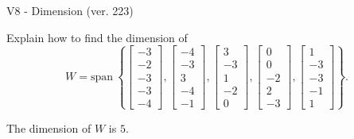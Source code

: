 \begin{exercise}
  \begin{exerciseTitle}V8 - Dimension (ver. 223)\end{exerciseTitle}
  \begin{exerciseStatement}
    Explain how to find the dimension of 
\[W=\mathrm{span}\ \left\{\left[\begin{array}{r}
-3 \\
-2 \\
-3 \\
-3 \\
-4
\end{array}\right] , \left[\begin{array}{r}
-4 \\
-3 \\
3 \\
-4 \\
-1
\end{array}\right] , \left[\begin{array}{r}
3 \\
-3 \\
1 \\
-2 \\
0
\end{array}\right] , \left[\begin{array}{r}
0 \\
0 \\
-2 \\
2 \\
-3
\end{array}\right] , \left[\begin{array}{r}
1 \\
-3 \\
-3 \\
-1 \\
1
\end{array}\right]\right\}.\]



  \end{exerciseStatement}
  \begin{exerciseAnswer}
   The dimension of \(W\) is  \(5\).
  


  \end{exerciseAnswer}
\end{exercise}